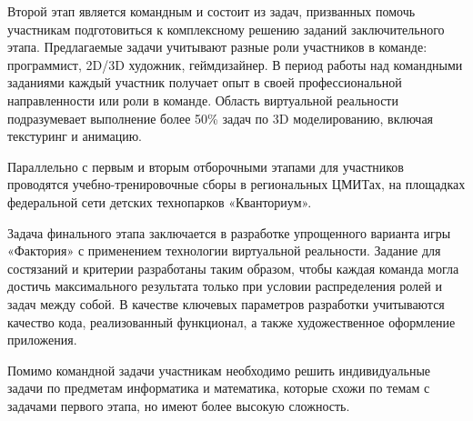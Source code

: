 Второй этап является командным и состоит из задач, призванных помочь участникам подготовиться к комплексному решению заданий заключительного этапа. Предлагаемые задачи учитывают разные роли участников в команде: программист, 2D/3D художник, геймдизайнер. В период работы над командными заданиями каждый участник получает опыт в своей профессиональной направленности или роли в команде. Область виртуальной реальности подразумевает выполнение более 50\% задач по 3D моделированию, включая текстуринг и анимацию. 

Параллельно с первым и вторым отборочными этапами для участников проводятся учебно-тренировочные сборы в региональных ЦМИТах, на площадках федеральной сети детских технопарков «Кванториум». 

Задача финального этапа заключается в разработке упрощенного варианта игры «Фактория» с применением технологии виртуальной реальности. Задание для состязаний и критерии разработаны таким образом, чтобы каждая команда могла достичь максимального результата только при условии распределения ролей и задач между собой. В качестве ключевых параметров разработки учитываются качество кода, реализованный функционал, а также художественное оформление приложения. 

Помимо командной задачи участникам необходимо решить индивидуальные задачи по предметам информатика и математика, которые схожи по темам с задачами первого этапа, но имеют более высокую сложность.
\clearpage
\endgroup